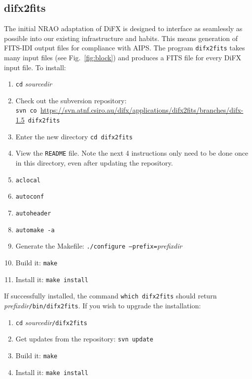 
\subsection{difx2fits}

The initial NRAO adaptation of DiFX is designed to interface as seamlessly as possible into our existing infrastructure and habits.
This means generation of FITS-IDI output files for compliance with AIPS.
The program {\tt difx2fits} takes many input files (see Fig.~\ref{fig:block}) and produces a FITS file for every DiFX input file.
To install:
\begin{enumerate}
\item {\tt cd} {\em sourcedir}
\item Check out the subversion repository: \\
{\tt svn co }\url{https://svn.atnf.csiro.au/difx/applications/difx2fits/branches/difx-1.5}{\tt\ difx2fits}
\item Enter the new directory {\tt cd difx2fits}
\item View the {\tt README} file.  
Note the next 4 instructions only need to be done once in this directory, even after updating the repository.
\item {\tt aclocal}
\item {\tt autoconf}
\item {\tt autoheader}
\item {\tt automake -a}
\item Generate the Makefile: {\tt ./configure --prefix=}{\em prefixdir}
\item Build it: {\tt make}
\item Install it: {\tt make install}
\end{enumerate}

If successfully installed, the command {\tt which difx2fits} should return {\em prefixdir}{\tt /bin/difx2fits}.
If you wish to upgrade the installation:
\begin{enumerate}
\item {\tt cd} {\em sourcedir}{\tt /difx2fits}
\item Get updates from the repository: {\tt svn update}
\item Build it: {\tt make}
\item Install it: {\tt make install}
\end{enumerate}








